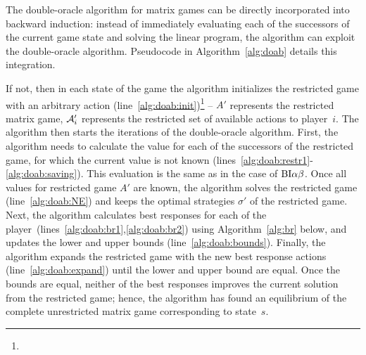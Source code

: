 The double-oracle algorithm for matrix games can be directly incorporated into backward induction: instead of immediately evaluating each of the successors of the current game state and solving the linear program, the algorithm can exploit the double-oracle algorithm. Pseudocode in Algorithm~\ref{alg:doab} details this integration.

If not, then in each state of the game the algorithm initializes the restricted game with an arbitrary action (line~\ref{alg:doab:init})\footnote{} -- $A'$ represents the restricted matrix game, $\mathcal{A}'_i$ represents the restricted set of available actions to player~$i$.
The algorithm then starts the iterations of the double-oracle algorithm.
First, the algorithm needs to calculate the value for each of the successors of the restricted game, for which the current value is not known (lines~\ref{alg:doab:restr1}-\ref{alg:doab:saving}). This evaluation is the same as in the case of $\textrm{BI}\alpha\beta$. %
Once all values for restricted game $A'$ are known, the algorithm solves the restricted game (line~\ref{alg:doab:NE}) and keeps the optimal strategies $\sigma'$ of the restricted game.
Next, the algorithm calculates best responses for each of the player~(lines~\ref{alg:doab:br1},\ref{alg:doab:br2}) using Algorithm~\ref{alg:br} below, and updates the lower and upper bounds (line~\ref{alg:doab:bounds}). Finally, the algorithm expands the restricted game with the new best response actions (line~\ref{alg:doab:expand}) until the lower and upper bound are equal.
Once the bounds are equal, neither of the best responses improves the current solution from the restricted game; hence, the algorithm has found an equilibrium of the complete unrestricted matrix game corresponding to state~$s$.

